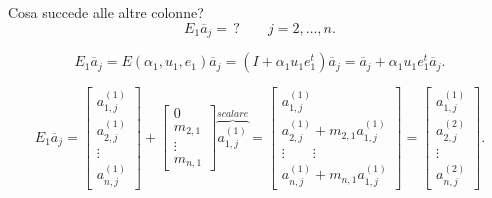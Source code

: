 \begin{dimo}
Cosa succede alle altre colonne?
\[E_1\overline{a}_j = \,? \qquad j = 2, \ldots, n.\]

\[E_1\overline{a}_j = E(\alpha_1, u_1, e_1)\overline{a}_j =
(I + \alpha_1u_1e_1^t)\overline{a}_j = \overline{a}_j +
\alpha_1u_1e_1^t\overline{a}_j.
\]

\[
E_1\overline{a}_j =
\left[
\begin{array}{c}
a_{1,j}^{(1)} \\
a_{2,j}^{(1)} \\
\vdots \\
a_{n,j}^{(1)}
\end{array}
\right]
+
\left[
\begin{array}{c}
0 \\
m_{2,1} \\
\vdots \\
m_{n,1}
\end{array}
\right] \overbrace{a_{1,j}^{(1)}}^{scalare}
=
\left[
\begin{array}{l}
a_{1,j}^{(1)} \\
a_{2,j}^{(1)} + m_{2,1} a_{1,j}^{(1)}\\
\vdots \qquad \vdots \\
a_{n,j}^{(1)} +m_{n,1} a_{1,j}^{(1)}
\end{array}
\right]
=
\left[
\begin{array}{l}
a_{1,j}^{(1)} \\
a_{2,j}^{(2)} \\
\vdots \\
a_{n,j}^{(2)}
\end{array}
\right].
\]
\end{dimo}


